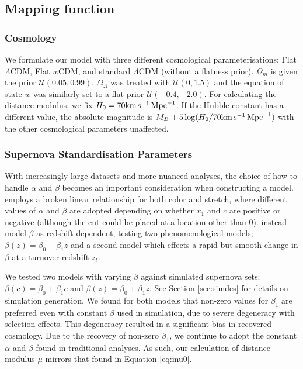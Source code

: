 \documentclass[a4paper,fleqn,usenatbib,manuscript]{emulateapj}
\newcommand{\blue}{\color{blue}}
\newcommand{\kmsmpc}{{\rm km}\,{\rm s}^{-1}\,{\rm Mpc}^{-1}}
\newcommand{\rubin}{\citetalias{Rubin2015}}
\begin{document}
\subsection{Mapping function}

\subsubsection{Cosmology}

We formulate our model with three different cosmological parameterisations; Flat $\Lambda$CDM, Flat $w$CDM, and standard $\Lambda$CDM {\blue (without a flatness prior)}. $\Omega_m$ is given the prior $\mathcal{U}(0.05, 0.99)$, $\Omega_\Lambda$ was treated with $\mathcal{U}(0, 1.5)$ and the equation of state $w$ was similarly set to a flat prior $\mathcal{U}(-0.4, -2.0)$. For calculating the distance modulus, we fix $H_0 = 70 \kmsmpc $. If the Hubble constant has a different value, the absolute magnitude is $M_B + 5\log(H_0/70 \kmsmpc )$ with the other cosmological parameters unaffected.

\subsubsection{Supernova Standardisation Parameters}

With increasingly large datasets and more nuanced analyses, the choice of how to handle $\alpha$ and $\beta$ becomes an important consideration when constructing a model. {\rubin} employs a broken linear relationship for both color and stretch, where different values of $\alpha$ and $\beta$ are adopted depending on whether $x_1$ and $c$ are positive or negative (although the cut could be placed at a location other than 0). \citet{Shariff2016} instead model $\beta$ as redshift-dependent, testing two phenomenological models; $\beta(z) = \beta_0 + \beta_1 z$ and a second model which effects a rapid but smooth change in $\beta$ at a turnover redshift $z_t$.

We tested two models with varying $\beta$ against simulated supernova sets; $\beta(c) = \beta_0 + \beta_1 c$ and $\beta(z) = \beta_0 + \beta_1 z$. See Section \ref{sec:simdes} for details on simulation generation. We found for both models that non-zero values for $\beta_1$ are preferred even with constant $\beta$ used in simulation, due to severe degeneracy with selection effects. This degeneracy resulted in a significant bias in recovered cosmology. Due to the recovery of non-zero $\beta_1$, we continue to adopt the constant $\alpha$ and $\beta$ found in traditional analyses. As such, our calculation of distance modulus $\mu$ mirrors that found in Equation \eqref{eq:mu0}.
\end{document}

